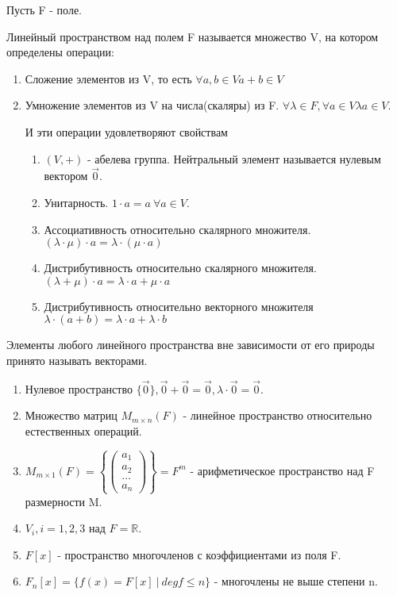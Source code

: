 Пусть F - поле.
\begin{definition}
	Линейный пространством над полем F называется множество V, на котором определены операции:
	\begin{enumerate}
		\item Сложение элементов из V, то есть \(\forall a,b\in V a+b\in V\)
		\item Умножение элементов из V на числа(скаляры) из F. \(\forall \lambda\in F, \forall a\in V \lambda a\in V\).
		
		И эти операции удовлетворяют свойствам
		\begin{enumerate}
			\item \((V, +)\) - абелева группа. Нейтральный элемент называется нулевым вектором \(\vec 0\).
			\item Унитарность. \(1\cdot a = a \> \forall a\in V\).
			\item Ассоциативность относительно скалярного множителя. \((\lambda\cdot\mu)\cdot a = \lambda\cdot(\mu\cdot a)\)
			\item Дистрибутивность относительно скалярного множителя. \((\lambda+\mu)\cdot a = \lambda\cdot a+\mu\cdot a\)
			\item Дистрибутивность относительно векторного множителя \(\lambda\cdot(a+b) = \lambda\cdot a + \lambda\cdot b\)
		\end{enumerate}
	\end{enumerate}
	Элементы любого линейного пространства вне зависимости от его природы принято называть векторами.
\end{definition}
\begin{example}
	\begin{enumerate}
		\item Нулевое пространство \(\{\vec 0\}, \vec 0 + \vec 0 = \vec 0, \lambda\cdot \vec 0 = \vec 0\).
		\item Множество матриц \(M_{m\times n}(F)\) - линейное пространство относительно естественных операций.
		\item \(M_{m\times 1}(F) = \left\{\begin{pmatrix}
			a_1 \\ a_2 \\ \ldots \\ a_n
		\end{pmatrix}\right\} = F^m\) - арифметическое пространство над F размерности M.
		\item \(V_i, i = 1, 2, 3\) над \(F = \mathbb{R}\).
		\item \(F[x]\) - пространство многочленов с коэффициентами из поля F.
		\item \(F_n[x] = \{f(x) = F[x] \: |\: degf\le n\}\) - многочлены не выше степени n.
	\end{enumerate}
\end{example}
